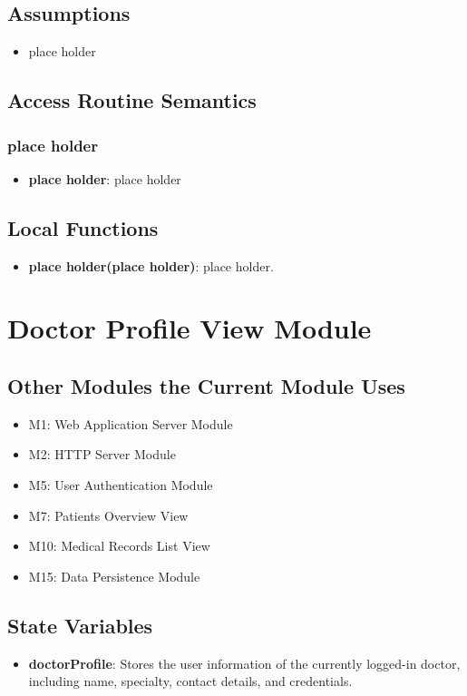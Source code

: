 \documentclass[12pt, titlepage]{article}
\begin{document}
\subsection{Assumptions}
\begin{itemize}
\item place holder
\end{itemize}

\subsection{Access Routine Semantics}
\subsubsection{place holder}
\begin{itemize}
    \item \textbf{place holder}: place holder
\end{itemize}

\subsection{Local Functions}
\begin{itemize}
\item \textbf{place holder(place holder)}: place holder.
\end{itemize}

\section{Doctor Profile View Module}

\subsection{Other Modules the Current Module Uses}
\begin{itemize}
    \item M1: Web Application Server Module
    \item M2: HTTP Server Module
    \item M5: User Authentication Module
    \item M7: Patients Overview View
    \item M10: Medical Records List View
    \item M15: Data Persistence Module
\end{itemize}

\subsection{State Variables}
\begin{itemize}
    \item \textbf{doctorProfile}: Stores the user information of the currently logged-in doctor, including name, specialty, contact details, and credentials.
\end{itemize}
\end{document}
